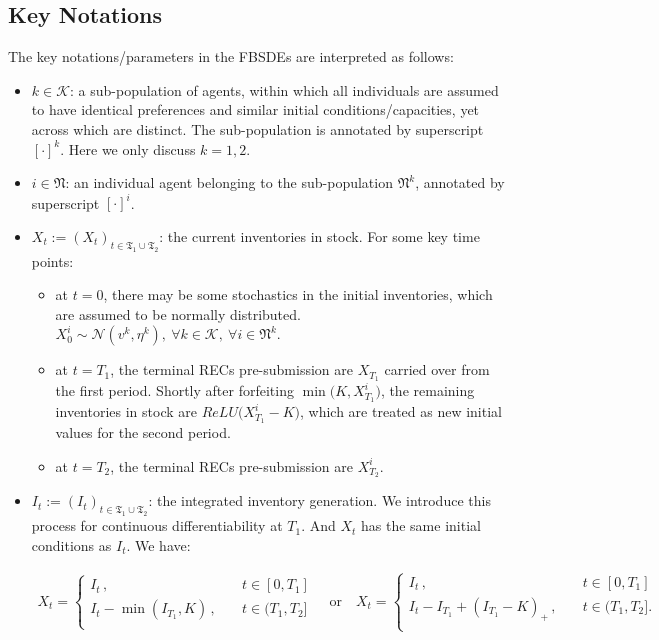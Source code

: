\documentclass[a4paper,10pt]{article}
\newcommand{\1}{\mathbf{1}}
\begin{document}
\subsection*{Key Notations}

The key notations/parameters in the FBSDEs are interpreted as follows:
\begin{itemize}
\item
  \(k \in \mathcal{K}\): a sub-population of agents, within which all
  individuals are assumed to have identical preferences and similar
  initial conditions/capacities, yet across which are distinct. The
  sub-population is annotated by superscript \([\cdot]^{k}\). Here we
  only discuss \(k=1,2\).
\item
  \(i \in \mathfrak{N}\): an individual agent belonging to the
  sub-population \(\mathfrak{N}^k\), annotated by superscript
  \([\cdot]^{i}\).
\item
  \(X_t := (X_t)_{t\in\mathfrak{T_1} \cup \mathfrak{T_2}}\): the current
  inventories in stock. For some key time points:

  \begin{itemize}
  \item
    at \(t=0\), there may be some stochastics in the initial
    inventories, which are assumed to be normally distributed.
    \(X_0^{i} \sim \mathcal{N}(v^k, \eta^k) ,~ \forall k \in \mathcal{K},~\forall i \in \mathfrak{N}^k\).
  \item
    at \(t=T_1\), the terminal RECs pre-submission are \(X_{T_1}\)
    carried over from the first period. Shortly after forfeiting
    \(\min\Big(K,X^i_{T_1}\Big)\), the remaining inventories in stock
    are \(ReLU\Big(X^i_{T_1}-K\Big)\), which are treated as new initial
    values for the second period.
  \item
    at \(t=T_2\), the terminal RECs pre-submission are \(X^i_{T_2}\).
  \end{itemize}
\item
  \(I_t := (I_t)_{t\in\mathfrak{T_1} \cup \mathfrak{T_2}}\): the
  integrated inventory generation. We introduce this process for
  continuous differentiability at \(T_1\). And \(X_t\) has the same
  initial conditions as \(I_t\). We have:

\begin{align}
    X_t=
    \begin{cases}
        I_t\, ,                  \quad& t \in [0,T_1]\\
        I_t- \min(I_{T_1},K)\, , \quad& t \in (T_1,T_2]\\
    \end{cases} 
    \quad\text{or}\quad
    X_t=
    \begin{cases}
        I_t\, ,                       \quad& t \in [0,T_1]\\
        I_t-I_{T_1}+(I_{T_1}-K)_+\, , \quad& t \in (T_1,T_2].\\
    \end{cases} 
\end{align}


\end{itemize}
\end{document}
